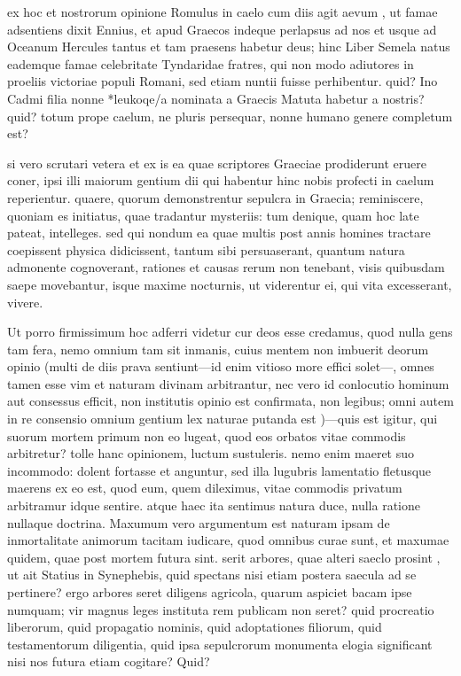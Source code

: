  ex hoc et nostrorum opinione Romulus in caelo cum diis agit aevum , ut famae adsentiens dixit Ennius, et apud Graecos indeque perlapsus ad nos et usque ad Oceanum Hercules tantus et tam praesens habetur deus; hinc Liber Semela natus eademque famae celebritate Tyndaridae fratres, qui non modo adiutores in proeliis victoriae populi Romani, sed etiam nuntii fuisse perhibentur. quid? Ino Cadmi filia nonne *leukoqe/a nominata a Graecis Matuta habetur a nostris? quid? totum prope caelum, ne pluris persequar, nonne humano genere completum est?

 si vero scrutari vetera et ex is ea quae scriptores Graeciae prodiderunt eruere coner, ipsi illi maiorum gentium dii qui habentur hinc nobis profecti in caelum reperientur. quaere, quorum demonstrentur sepulcra in Graecia; reminiscere, quoniam es initiatus, quae tradantur mysteriis: tum denique, quam hoc late pateat, intelleges. sed qui nondum ea quae multis post annis homines tractare coepissent physica didicissent, tantum sibi persuaserant, quantum natura admonente cognoverant, rationes et causas rerum non tenebant, visis quibusdam saepe movebantur, isque maxime nocturnis, ut viderentur ei, qui vita excesserant, vivere.

 Ut porro firmissimum hoc adferri videtur cur deos esse credamus, quod nulla gens tam fera, nemo omnium tam sit inmanis, cuius mentem non imbuerit deorum opinio (multi de diis prava sentiunt—id enim vitioso more effici solet—, omnes tamen esse vim et naturam divinam arbitrantur, nec vero id conlocutio hominum aut consessus efficit, non institutis opinio est confirmata, non legibus; omni autem in re consensio omnium gentium lex naturae putanda est )—quis est igitur, qui suorum mortem primum non eo lugeat, quod eos orbatos vitae commodis arbitretur? tolle hanc opinionem, luctum sustuleris. nemo enim maeret suo incommodo: dolent fortasse et anguntur, sed illa lugubris lamentatio fletusque maerens ex eo est, quod eum, quem dileximus, vitae commodis privatum arbitramur idque sentire. atque haec ita sentimus natura duce, nulla ratione nullaque doctrina. Maxumum vero argumentum est naturam ipsam de inmortalitate animorum tacitam iudicare, quod omnibus curae sunt, et maxumae quidem, quae post mortem futura sint. serit arbores, quae alteri saeclo prosint , ut ait Statius in Synephebis, quid spectans nisi etiam postera saecula ad se pertinere? ergo arbores seret diligens agricola, quarum aspiciet bacam ipse numquam; vir magnus leges instituta rem publicam non seret? quid procreatio liberorum, quid propagatio nominis, quid adoptationes filiorum, quid testamentorum diligentia, quid ipsa sepulcrorum monumenta elogia significant nisi nos futura etiam cogitare? Quid?

